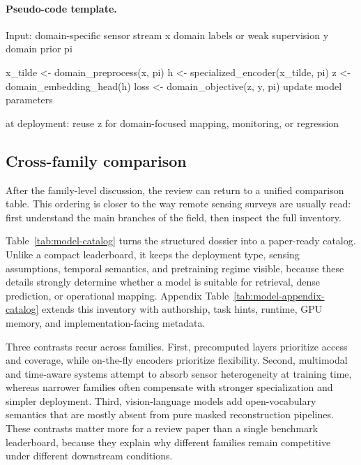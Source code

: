 \paragraph{Pseudo-code template.}
\begin{pseudocode}
Input:
  domain-specific sensor stream x
  domain labels or weak supervision y
  domain prior pi

x_tilde <- domain_preprocess(x, pi)
h <- specialized_encoder(x_tilde, pi)
z <- domain_embedding_head(h)
loss <- domain_objective(z, y, pi)
update model parameters

at deployment:
  reuse z for domain-focused mapping, monitoring, or regression
\end{pseudocode}

\subsection{Cross-family comparison}

After the family-level discussion, the review can return to a unified comparison table. This ordering is closer to the way remote sensing surveys are usually read: first understand the main branches of the field, then inspect the full inventory.

Table~\ref{tab:model-catalog} turns the structured dossier into a paper-ready catalog. Unlike a compact leaderboard, it keeps the deployment type, sensing assumptions, temporal semantics, and pretraining regime visible, because these details strongly determine whether a model is suitable for retrieval, dense prediction, or operational mapping. Appendix Table~\ref{tab:model-appendix-catalog} extends this inventory with authorship, task hints, runtime, GPU memory, and implementation-facing metadata.



Three contrasts recur across families. First, precomputed layers prioritize access and coverage, while on-the-fly encoders prioritize flexibility. Second, multimodal and time-aware systems attempt to absorb sensor heterogeneity at training time, whereas narrower families often compensate with stronger specialization and simpler deployment. Third, vision-language models add open-vocabulary semantics that are mostly absent from pure masked reconstruction pipelines. These contrasts matter more for a review paper than a single benchmark leaderboard, because they explain why different families remain competitive under different downstream conditions.

